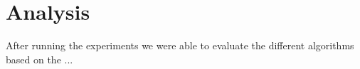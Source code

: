 \section{Analysis}
\label{sec:analysis}
After running the experiments we were able to evaluate the different algorithms based on the ...

